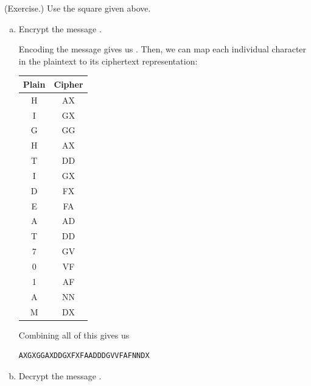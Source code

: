 \documentclass[letterpaper]{article}
\newcommand{\0}{\mathbf{0}}
\begin{document}
\begin{mdframed}
    (Exercise.) Use the square given above.
    \begin{enumerate}[(a)]
        \item Encrypt the message .
        \begin{mdframed}
            Encoding the message gives us . Then, we can map each individual character in the plaintext to its ciphertext representation:
            \begin{center}
                \begin{tabular}{c|c}
                    \textbf{Plain} & \textbf{Cipher} \\ 
                    \hline 
                    H              & AX \\
                    I              & GX \\
                    G              & GG \\
                    H              & AX \\
                    T              & DD \\
                    I              & GX \\
                    D              & FX \\
                    E              & FA \\
                    A              & AD \\
                    T              & DD \\
                    7              & GV \\
                    0              & VF \\
                    1              & AF \\
                    A              & NN \\
                    M              & DX 
                \end{tabular}
            \end{center}
            Combining all of this gives us 
            \begin{mdframed}
                \begin{verbatim}
AXGXGGAXDDGXFXFAADDDGVVFAFNNDX\end{verbatim}
            \end{mdframed}
        \end{mdframed}
        \item Decrypt the message .

\end{enumerate}
\end{mdframed}
\end{document}
